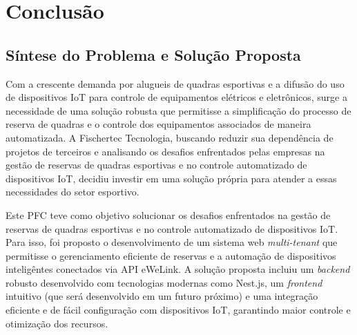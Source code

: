 \chapter{Conclusão}\label{cap:conclusao}



\section{Síntese do Problema e Solução Proposta}


Com a crescente demanda por alugueis de quadras esportivas e a difusão do uso de dispositivos \acrshort{IoT} para controle de equipamentos elétricos e eletrônicos, surge a necessidade de uma solução robusta que permitisse a simplificação do processo de reserva de quadras e o controle dos equipamentos associados de maneira automatizada.
A Fischertec Tecnologia, buscando reduzir sua dependência de projetos de terceiros e analisando os desafios enfrentados pelas empresas na gestão de reservas de quadras esportivas e no controle automatizado de dispositivos \acrshort{IoT}, decidiu investir em uma solução própria para atender a essas necessidades do setor esportivo.

Este \acrshort{PFC} teve como objetivo solucionar os desafios enfrentados na gestão de reservas de quadras esportivas e no controle automatizado de dispositivos \acrshort{IoT}. Para isso, foi proposto o desenvolvimento de um sistema web \textit{multi-tenant} que permitisse o gerenciamento eficiente de reservas e a automação de dispositivos inteligêntes conectados via API eWeLink. A solução proposta incluiu um \textit{backend} robusto desenvolvido com tecnologias modernas como Nest.js, um \textit{frontend} intuitivo (que será desenvolvido em um futuro próximo) e uma integração eficiente e de fácil configuração com dispositivos \acrshort{IoT}, garantindo maior controle e otimização dos recursos.

